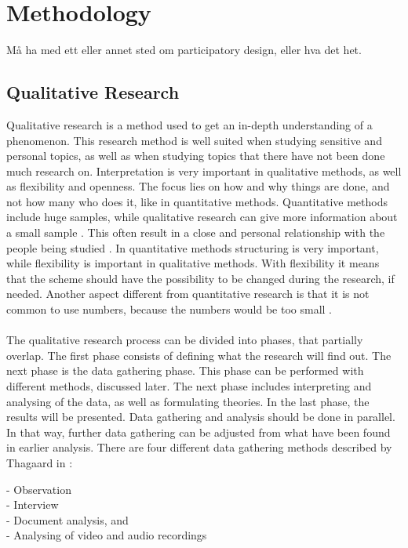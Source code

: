 \chapter{Methodology}
Må ha med ett eller annet sted om participatory design, eller hva det het.

\section{Qualitative Research}
Qualitative research is a method used to get an in-depth understanding of a phenomenon. This research method is well suited when studying sensitive and personal topics, as well as when studying topics that there have not been done much research on. Interpretation is very important in qualitative methods, as well as flexibility and openness. The focus lies on how and why things are done, and not how many who does it, like in quantitative methods. Quantitative methods include huge samples, while qualitative research can give more information about a small sample \cite{qualitative}. This often result in a close and personal relationship with the people being studied \cite{tjora}. In quantitative methods structuring is very important, while flexibility is important in qualitative methods. With flexibility it means that the scheme should have the possibility to be changed during the research, if needed. Another aspect different from quantitative research is that it is not common to use numbers, because the numbers would be too small \cite{qualitative}. \\ \\
The qualitative research process can be divided into phases, that partially overlap. The first phase consists of defining what the research will find out. The next phase is the data gathering phase. This phase can be performed with different methods, discussed later. The next phase includes interpreting and analysing of the data, as well as formulating theories. In the last phase, the results will be presented. Data gathering and analysis should be done in parallel. In that way, further data gathering can be adjusted from what have been found in earlier analysis. There are four different data gathering methods described by Thagaard in \cite{qualitative}:

- Observation \\
- Interview \\ 
- Document analysis, and \\
- Analysing of video and audio recordings

